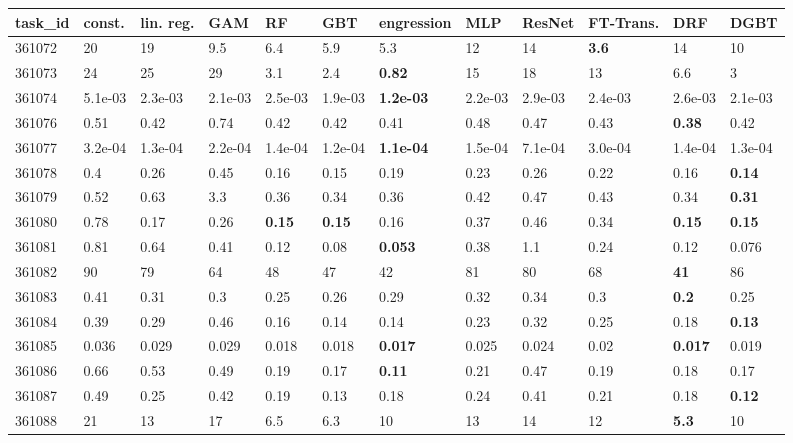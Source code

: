 \begin{table}[ht!]
\centering
\begingroup\footnotesize
\begin{tabular}{llllllllllll}
  \hline
\hline
task\_id & const. & lin. reg. & GAM & RF & GBT & engression & MLP & ResNet & FT-Trans. & DRF & DGBT \\ 
  \hline
361072 & 20 & 19 & 9.5 & 6.4 & 5.9 & 5.3 & 12 & 14 & \textbf{3.6} & 14 & 10 \\ 
  361073 & 24 & 25 & 29 & 3.1 & 2.4 & \textbf{0.82} & 15 & 18 & 13 & 6.6 & 3 \\ 
  361074 & 5.1e-03 & 2.3e-03 & 2.1e-03 & 2.5e-03 & 1.9e-03 & \textbf{1.2e-03} & 2.2e-03 & 2.9e-03 & 2.4e-03 & 2.6e-03 & 2.1e-03 \\ 
  361076 & 0.51 & 0.42 & 0.74 & 0.42 & 0.42 & 0.41 & 0.48 & 0.47 & 0.43 & \textbf{0.38} & 0.42 \\ 
  361077 & 3.2e-04 & 1.3e-04 & 2.2e-04 & 1.4e-04 & 1.2e-04 & \textbf{1.1e-04} & 1.5e-04 & 7.1e-04 & 3.0e-04 & 1.4e-04 & 1.3e-04 \\ 
  361078 & 0.4 & 0.26 & 0.45 & 0.16 & 0.15 & 0.19 & 0.23 & 0.26 & 0.22 & 0.16 & \textbf{0.14} \\ 
  361079 & 0.52 & 0.63 & 3.3 & 0.36 & 0.34 & 0.36 & 0.42 & 0.47 & 0.43 & 0.34 & \textbf{0.31} \\ 
  361080 & 0.78 & 0.17 & 0.26 & \textbf{0.15} & \textbf{0.15} & 0.16 & 0.37 & 0.46 & 0.34 & \textbf{0.15} & \textbf{0.15} \\ 
  361081 & 0.81 & 0.64 & 0.41 & 0.12 & 0.08 & \textbf{0.053} & 0.38 & 1.1 & 0.24 & 0.12 & 0.076 \\ 
  361082 & 90 & 79 & 64 & 48 & 47 & 42 & 81 & 80 & 68 & \textbf{41} & 86 \\ 
  361083 & 0.41 & 0.31 & 0.3 & 0.25 & 0.26 & 0.29 & 0.32 & 0.34 & 0.3 & \textbf{0.2} & 0.25 \\ 
  361084 & 0.39 & 0.29 & 0.46 & 0.16 & 0.14 & 0.14 & 0.23 & 0.32 & 0.25 & 0.18 & \textbf{0.13} \\ 
  361085 & 0.036 & 0.029 & 0.029 & 0.018 & 0.018 & \textbf{0.017} & 0.025 & 0.024 & 0.02 & \textbf{0.017} & 0.019 \\ 
  361086 & 0.66 & 0.53 & 0.49 & 0.19 & 0.17 & \textbf{0.11} & 0.21 & 0.47 & 0.19 & 0.18 & 0.17 \\ 
  361087 & 0.49 & 0.25 & 0.42 & 0.19 & 0.13 & 0.18 & 0.24 & 0.41 & 0.21 & 0.18 & \textbf{0.12} \\ 
  361088 & 21 & 13 & 17 & 6.5 & 6.3 & 10 & 13 & 14 & 12 & \textbf{5.3} & 10 \\ 

\end{tabular}
\end{table}

